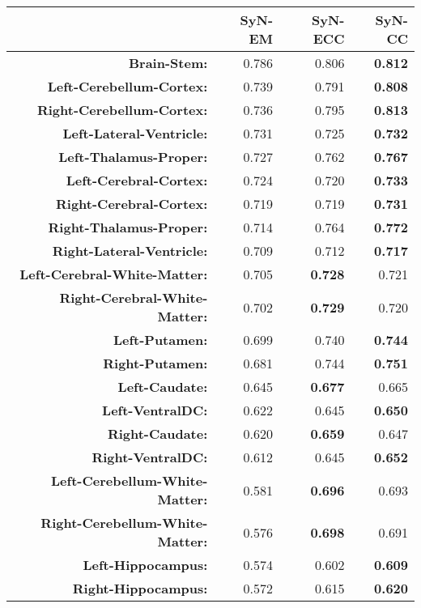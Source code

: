 \begin{table}[htbp]
  {\small
  \centering
    \begin{tabular}{rrrr}
    \toprule
    \textbf{} & \textbf{SyN-EM} & \textbf{SyN-ECC} & \textbf{SyN-CC} \\
    \midrule
    \textbf{Brain-Stem:} & 0.786 & 0.806 & \textbf{0.812} \\
    \textbf{Left-Cerebellum-Cortex:} & 0.739 & 0.791 & \textbf{0.808} \\
    \textbf{Right-Cerebellum-Cortex:} & 0.736 & 0.795 & \textbf{0.813} \\
    \textbf{Left-Lateral-Ventricle:} & 0.731 & 0.725 & \textbf{0.732} \\
    \textbf{Left-Thalamus-Proper:} & 0.727 & 0.762 & \textbf{0.767} \\
    \textbf{Left-Cerebral-Cortex:} & 0.724 & 0.720 & \textbf{0.733} \\
    \textbf{Right-Cerebral-Cortex:} & 0.719 & 0.719 & \textbf{0.731} \\
    \textbf{Right-Thalamus-Proper:} & 0.714 & 0.764 & \textbf{0.772} \\
    \textbf{Right-Lateral-Ventricle:} & 0.709 & 0.712 & \textbf{0.717} \\
    \textbf{Left-Cerebral-White-Matter:} & 0.705 & \textbf{0.728} & 0.721 \\
    \textbf{Right-Cerebral-White-Matter:} & 0.702 & \textbf{0.729} & 0.720 \\
    \textbf{Left-Putamen:} & 0.699 & 0.740 & \textbf{0.744} \\
    \textbf{Right-Putamen:} & 0.681 & 0.744 & \textbf{0.751} \\
    \textbf{Left-Caudate:} & 0.645 & \textbf{0.677} & 0.665 \\
    \textbf{Left-VentralDC:} & 0.622 & 0.645 & \textbf{0.650} \\
    \textbf{Right-Caudate:} & 0.620 & \textbf{0.659} & 0.647 \\
    \textbf{Right-VentralDC:} & 0.612 & 0.645 & \textbf{0.652} \\
    \textbf{Left-Cerebellum-White-Matter:} & 0.581 & \textbf{0.696} & 0.693 \\
    \textbf{Right-Cerebellum-White-Matter:} & 0.576 & \textbf{0.698} & 0.691 \\
    \textbf{Left-Hippocampus:} & 0.574 & 0.602 & \textbf{0.609} \\
    \textbf{Right-Hippocampus:} & 0.572 & 0.615 & \textbf{0.620} \\

\end{tabular}}
\end{table}
